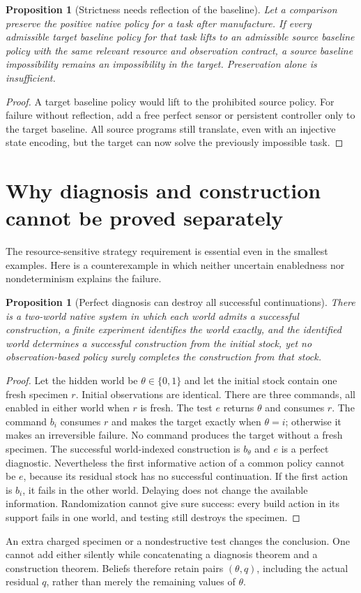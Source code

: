 \documentclass[11pt]{article}
\newtheorem{proposition}[theorem]{Proposition}
\theoremstyle{definition}
\theoremstyle{remark}
\begin{document}
\begin{proposition}[Strictness needs reflection of the baseline]
\label{prop:baseline-reflection}
Let a comparison preserve the positive native policy for a task after
manufacture. If every admissible target baseline policy for that task
lifts to an admissible source baseline policy with the same relevant
resource and observation contract, a source baseline impossibility
remains an impossibility in the target. Preservation alone is insufficient.
\end{proposition}
\begin{proof}
A target baseline policy would lift to the prohibited source policy.
For failure without reflection, add a free perfect sensor or persistent
controller only to the target baseline. All source programs still
translate, even with an injective state encoding, but the target can now
solve the previously impossible task.
\end{proof}


\section{Why diagnosis and construction cannot be proved separately}
\label{sec:obstructions}
The resource-sensitive strategy requirement is essential even in the
smallest examples. Here is a counterexample in which neither uncertain
enabledness nor nondeterminism explains the failure.

\begin{proposition}[Perfect diagnosis can destroy all successful continuations]
\label{prop:destructive-diagnosis}
There is a two-world native system in which each world admits a
successful construction, a finite experiment identifies the world
exactly, and the identified world determines a successful construction
from the initial stock, yet no observation-based policy surely completes
the construction from that stock.
\end{proposition}
\begin{proof}
Let the hidden world be $\theta\in\{0,1\}$ and let the initial stock
contain one fresh specimen $r$. Initial observations are identical.
There are three commands, all enabled in either world when $r$ is fresh.
The test $e$ returns $\theta$ and consumes $r$. The command $b_i$ consumes
$r$ and makes the target exactly when $\theta=i$; otherwise it makes an
irreversible failure. No command produces the target without a fresh
specimen. The successful world-indexed construction is $b_\theta$ and
$e$ is a perfect diagnostic. Nevertheless the first informative action
of a common policy cannot be $e$, because its residual stock has no
successful continuation. If the first action is $b_i$, it fails in the
other world. Delaying does not change the available information.
Randomization cannot give sure success: every build action in its
support fails in one world, and testing still destroys the specimen.
\end{proof}
An extra charged specimen or a nondestructive test changes the conclusion.
One cannot add either silently while concatenating a diagnosis theorem
and a construction theorem. Beliefs therefore retain pairs
$(\theta,q)$, including the actual residual $q$, rather than merely the
remaining values of $\theta$.
\end{document}
